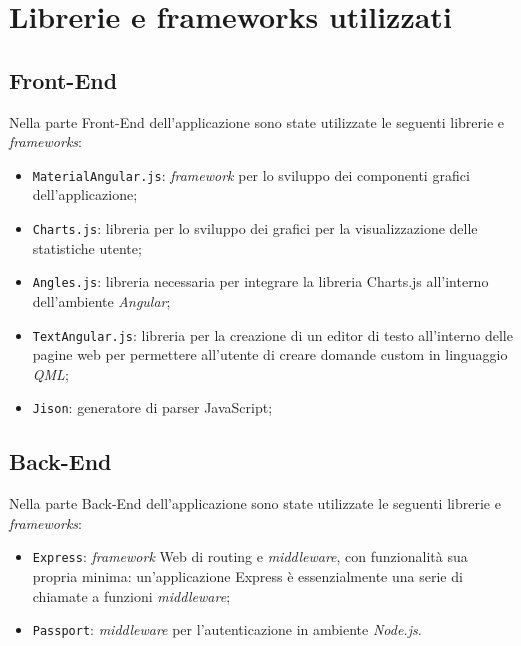 \newpage
\section{Librerie e frameworks utilizzati}
\subsection{Front-End}
Nella parte Front-End dell'applicazione sono state utilizzate le seguenti librerie e \textit{frameworks}:
\begin{itemize}
	\item \texttt{MaterialAngular.js}: \textit{framework} per lo sviluppo dei componenti grafici dell'applicazione;
	\item \texttt{Charts.js}: libreria per lo sviluppo dei grafici per la visualizzazione delle statistiche
	utente;
	\item \texttt{Angles.js}: libreria necessaria per integrare la libreria Charts.js all'interno
	dell'ambiente \textit{Angular};
	\item \texttt{TextAngular.js}: libreria per la creazione di un editor di testo all'interno delle pagine web per permettere all'utente di creare domande custom in linguaggio \textit{QML};
	\item \texttt{Jison}: generatore di parser JavaScript;
\end{itemize}
\subsection{Back-End}
Nella parte Back-End dell'applicazione sono state utilizzate le seguenti librerie e \textit{frameworks}:
\begin{itemize}
	\item \texttt{Express}: \textit{framework} Web di routing e \textit{middleware}, con funzionalità sua propria minima: un'applicazione Express è essenzialmente una serie di chiamate a funzioni \textit{middleware};
	\item \texttt{Passport}: \textit{middleware} per l'autenticazione in ambiente \textit{Node.js}.
\end{itemize}
